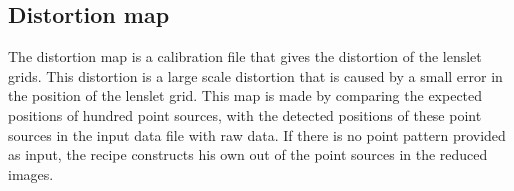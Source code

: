 \documentclass[twoside,single]{lion-msc}
\begin{document}
\subsection{Distortion map}
The distortion map is a calibration file that gives the distortion of the lenslet grids. This distortion is a large scale distortion that is caused by a small error in the position of the lenslet grid. This map is made by comparing the expected positions of hundred point sources, with the detected positions of these point sources in the input data file with raw data. If there is no point pattern provided as input, the recipe constructs his own out of the point sources in the reduced images.

%
\end{document}
